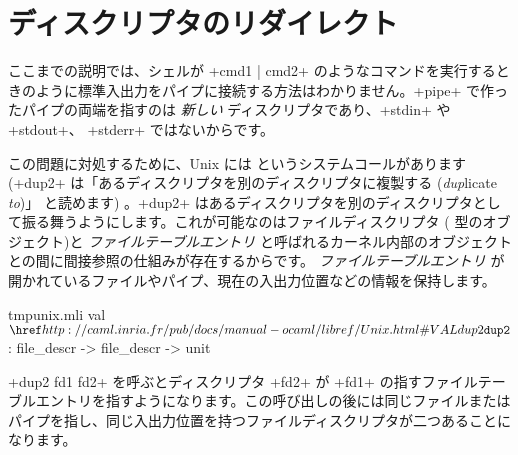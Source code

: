 \section{ディスクリプタのリダイレクト}

ここまでの説明では、シェルが \ml+cmd1 | cmd2+ のようなコマンドを実行するときのように標準入出力をパイプに接続する方法はわかりません。\ml+pipe+ で作ったパイプの両端を指すのは \emph{新しい} ディスクリプタであり、\ml+stdin+ や \ml+stdout+、 \ml+stderr+ ではないからです。

この問題に対処するために、Unix には  というシステムコールがあります (\ml+dup2+ は「あるディスクリプタを別のディスクリプタに複製する (\emph{dup}licate \emph{to})」 と読めます) 。\ml+dup2+ はあるディスクリプタを別のディスクリプタとして振る舞うようにします。これが可能なのはファイルディスクリプタ ( 型のオブジェクト)と \emph{ファイルテーブルエントリ} と呼ばれるカーネル内部のオブジェクトとの間に間接参照の仕組みが存在するからです。 \emph{ファイルテーブルエントリ} が開かれているファイルやパイプ、現在の入出力位置などの情報を保持します。
%
\begin{listingcodefile}{tmpunix.mli}
val $\libvalue{Unix}{dup2}$ : file_descr -> file_descr -> unit
\end{listingcodefile}
%
\ml+dup2 fd1 fd2+ を呼ぶとディスクリプタ \ml+fd2+ が \ml+fd1+ の指すファイルテーブルエントリを指すようになります。この呼び出しの後には同じファイルまたはパイプを指し、同じ入出力位置を持つファイルディスクリプタが二つあることになります。

